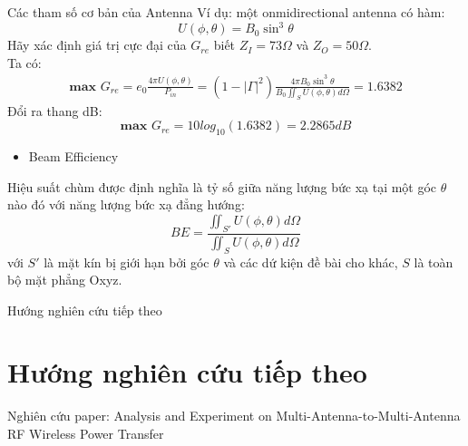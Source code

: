 \documentclass[8pt]{beamer}
\begin{document}
\begin{frame}{Các tham số cơ bản của Antenna}
Ví dụ: một onmidirectional antenna có hàm: $$U(\phi,\theta)=B_{0}\sin^3{\theta}$$
Hãy xác định giá trị cực đại của $G_{re}$ biết $Z_{I}=73\Omega$ và $Z_{O}=50\Omega$.
\\  Ta có:
\begin{equation*}
\begin{split}
	\textbf{max }G_{re}=e_{0}\frac{4\pi U(\phi,\theta)}{P_{in}}=(1-|\Gamma|^2)\frac{4\pi B_{0}\sin^3{\theta}}{B_{0}\iint_{S}U(\phi,\theta)d\Omega}=1.6382
\end{split}
\end{equation*}
Đổi ra thang dB: $$\textbf{max }G_{re}=10log_{10}(1.6382)=2.2865dB$$
\begin{itemize}
	\item  Beam Efficiency
\end{itemize}
 Hiệu suất chùm được định nghĩa là tỷ số giữa năng lượng bức xạ tại một góc $\theta$ nào đó với năng lượng bức xạ đẳng hướng:
 $$BE=\frac{\iint_{S'}U(\phi,\theta)d\Omega}{\iint_{S}U(\phi,\theta)d\Omega}$$
 với $S'$ là mặt kín bị giới hạn bởi góc $\theta$ và các dứ kiện đề bài cho khác, $S$ là toàn bộ mặt phẳng Oxyz.
\end{frame}
\begin{frame}{Hướng nghiên cứu tiếp theo}
	\section{Hướng nghiên cứu tiếp theo}
Nghiên cứu paper: Analysis and Experiment on Multi-Antenna-to-Multi-Antenna RF Wireless Power Transfer
\end{frame}
\end{document}
